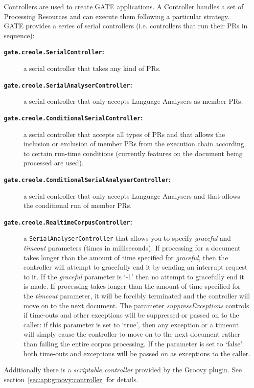 Controllers are used to create GATE applications. A Controller handles a set of
Processing Resources and can execute them following a particular strategy.  GATE
provides a series of serial controllers (i.e. controllers that run their PRs in
sequence):

\begin{description}
\item[{\bf {\tt gate.creole.SerialController}:}] a serial controller that takes any
kind of PRs.
\item[{\bf {\tt gate.creole.SerialAnalyserController}:}] a serial controller that
only accepts Language Analysers as member PRs.
\item[{\bf {\tt gate.creole.ConditionalSerialController}:}] a serial controller
that accepts all types of PRs and that allows the inclusion or exclusion of
member PRs from the execution chain according to certain run-time conditions
(currently features on the document being processed are used).
\item[{\bf {\tt gate.creole.ConditionalSerialAnalyserController}:}] a serial
controller that only accepts Language Analysers and that allows the conditional
run of member PRs.
\item[{\bf {\tt gate.creole.RealtimeCorpusController}:}] a
{\tt SerialAnalyserController} that allows you to specify {\em graceful} and {\em timeout}
parameters (times in milliseconds).  If processing for a document takes longer than the 
amount of time specified for {\em graceful},  then the 
controller will attempt to gracefully end it by sending an interrupt 
request to it. If the {\em graceful} parameter is `-1' then no attempt to
gracefully end it is made. If processing takes longer than the amount of time 
specified for the {\em timeout} parameter, it 
will be forcibly terminated and the controller will move on to the next
document.  
The parameter {\em suppressExceptions} controls if time-outs and other 
exceptions will be suppressed or passed on to the caller: if this parameter
is set to `true', then any exception or a timeout will 
simply cause the controller to move on to the next document rather than failing
the entire corpus processing. If the parameter is set to `false' both 
time-outs and exceptions will be passed on as exceptions to the caller.
\end{description}

Additionally there is a {\em scriptable controller} provided by the Groovy
plugin.  See section~\ref{sec:api:groovy:controller} for details.

